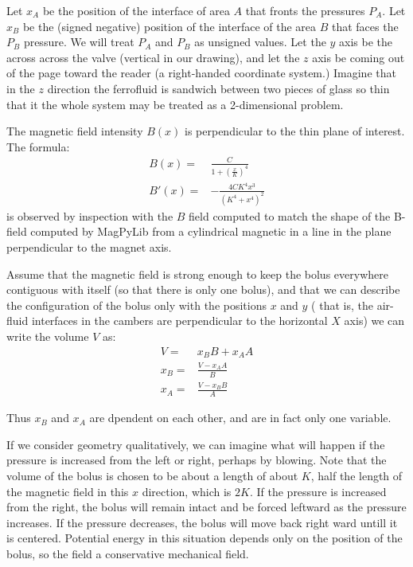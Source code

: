 \documentclass{asme2ej}
\begin{document}
Let $x_A$ be the position of the interface of area $A$ that fronts the pressures $P_A$.
Let $x_B$ be the (signed negative) position of the interface of the area $B$ that
faces the $P_B$ pressure. We will treat $P_A$ and $P_B$ as unsigned values.
Let the $y$ axis be the across across the valve (vertical in our drawing), and
let the $z$ axis be coming out of the page toward the reader (a right-handed coordinate system.)
Imagine that in the $z$ direction the ferrofluid is sandwich between two pieces of glass
so thin that it the whole system may be treated as a 2-dimensional problem.



The magnetic field intensity $B(x)$ is perpendicular to the thin plane of interest.
The formula:
\begin{align}
  B(x) =& \frac{C}{1+(\frac{x}{K})^4} \\
  B'(x) =& -\frac{4 C K^4 x^3}{(K^4 + x^4)^2}
\end{align}
is observed by inspection with the $B$ field computed to match the shape of the B-field computed
by MagPyLib from a cylindrical magnetic in a line in the plane perpendicular to the magnet axis.


Assume that the magnetic field is strong enough to keep the bolus everywhere
contiguous with itself (so that there is only one bolus), and that we can
describe the configuration of the bolus only with the positions $x$ and $y$ (
that is, the air-fluid interfaces in the cambers are perpendicular to the horizontal $X$ axis)
we can write the
volume $V$ as:
\begin{align}
  V = & x_BB + x_AA \\
  x_B = & \frac{V - x_AA}{B} \\
  x_A = & \frac{V - x_BB}{A}
  \label{eqn:yvalue}
\end{align}

Thus $x_B$ and $x_A$ are dpendent on each other, and are in fact only one variable.

If we consider geometry qualitatively, we can imagine what will happen
if the pressure is increased from the left or right, perhaps by blowing.
Note that the volume of the bolus is chosen to be about a length of about $K$,
half the length
of the magnetic field in this $x$ direction, which is $2K$.
If the pressure is increased from the right, the bolus will remain intact
and be forced leftward as the pressure increases. If the pressure decreases,
the bolus will move back right ward untill it is centered.
Potential energy in this situation depends only on the position of the bolus,
so the field a conservative mechanical field.
\end{document}
